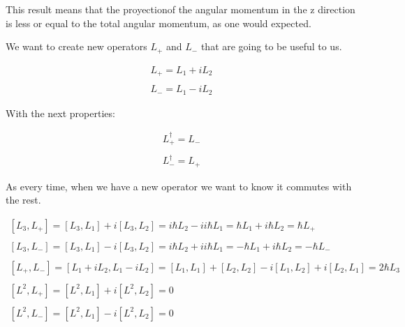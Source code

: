 This result means that the proyectionof the angular momentum in the z direction is less or equal to the total angular momentum, as one would expected.

We want to create new operators $L_+$ and $L_-$ that are going to be useful to us.

\begin{equation}
  \begin{array}{c}
    L_+ = L_1 + i L_2
    \\

    \\
    L_- = L_1 - i L_2
  \end{array}
\end{equation}

With the next properties:

\begin{equation}
  \begin{array}{c}
    L_+^\dagger = L_-
    \\

    \\
    L_-^\dagger = L_+
  \end{array}
\end{equation}

As every time, when we have a new operator we want to know it commutes with the rest.

\begin{equation}
  \begin{array}{c}
    \left[L_3, L_+\right] = \left[L_3,L_1\right] + i \left[L_3,L_2\right] = i\hbar L_2 - i i\hbar L_1 = \hbar L_1 + i \hbar L_2 = \hbar L_+
    \\

    \\
    \left[L_3,L_-\right] = \left[L_3,L_1\right] - i \left[L_3,L_2\right] = i\hbar L_2 + i i\hbar L_1 = -\hbar L_1 + i \hbar L_2 = - \hbar L_-
    \\

    \\
    \left[L_+,L_-\right] = \left[L_1 +i L_2, L_1 - iL_2\right] = \left[L_1,L_1\right] + \left[L_2,L_2\right] - i\left[L_1,L_2\right] + i\left[L_2,L_1\right] = 2\hbar L_3
    \\

    \\
    \left[L^2,L_+\right] = \left[L^2,L_1\right] + i \left[L^2,L_2\right] = 0
    \\

    \\
    \left[L^2,L_-\right] = \left[L^2,L_1\right] - i \left[L^2,L_2\right] = 0
  \end{array}
\end{equation}

